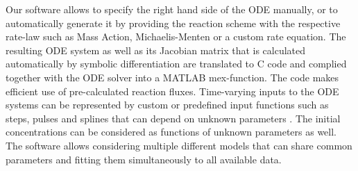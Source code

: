 \documentclass{bioinfo}
\begin{document}
Our software allows to specify the right hand side of the ODE manually, or to 
automatically generate it by providing the reaction scheme with the respective rate-law such as Mass Action, Michaelis-Menten or a custom rate 
equation. The resulting ODE system as well as its Jacobian matrix that is calculated 
automatically by symbolic differentiation are translated to C code and complied together 
with the ODE solver into a MATLAB mex-function. The code makes efficient use of pre-calculated reaction fluxes. 
Time-varying inputs to the ODE systems can be represented by custom or predefined input 
functions such as steps, pulses and splines that can depend on unknown parameters 
\citep{Schelker:2012uq}. The initial concentrations can be considered as functions of 
unknown parameters as well. The software allows considering multiple different models 
that can share common parameters and fitting them simultaneously to all available data. 
\end{document}
